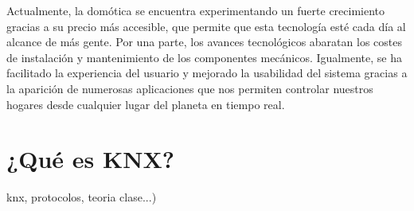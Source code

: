 Actualmente, la domótica se encuentra experimentando un fuerte crecimiento gracias a su precio más accesible, que permite que esta tecnología esté cada día al alcance de más gente. Por una parte, los avances tecnológicos abaratan los costes de instalación y mantenimiento de los componentes mecánicos. Igualmente, se ha facilitado la experiencia del usuario y mejorado la usabilidad del sistema gracias a la aparición de numerosas aplicaciones que nos permiten controlar nuestros hogares desde cualquier lugar del planeta en tiempo real. 


\section{¿Qué es KNX?}

knx, protocolos, teoria clase...)